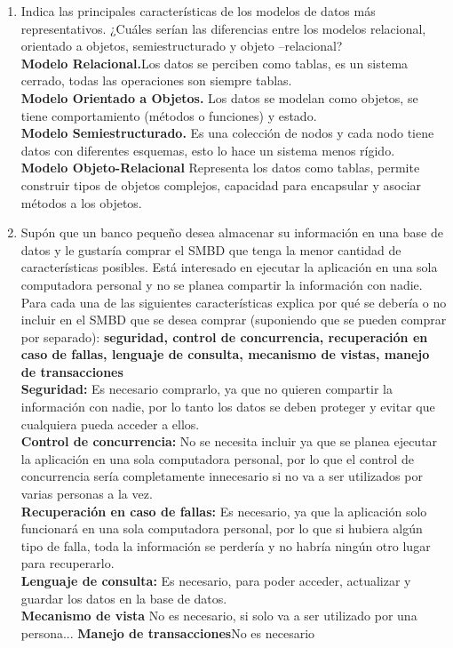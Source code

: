 \documentclass[12pt]{article}
\begin{document}
\begin{enumerate}
\begin{itemize}
	  \end{itemize}
  
      \item Indica las principales características de los modelos de
      datos más representativos. ¿Cuáles serían las diferencias
      entre los  modelos relacional, orientado a objetos,
      semiestructurado y objeto –relacional?\\
      \textbf{Modelo Relacional.}Los datos se perciben como tablas,
      es un sistema cerrado, todas las operaciones son siempre tablas.\\
      \textbf{Modelo Orientado a Objetos.} Los datos se modelan como
      objetos, se tiene comportamiento (métodos o funciones) y estado.\\
      \textbf{Modelo Semiestructurado.} Es una colección de nodos y
      cada nodo tiene datos con diferentes esquemas, esto lo hace un 
      sistema menos rígido.\\
      \textbf{Modelo Objeto-Relacional} Representa los datos como tablas,
      permite construir tipos de objetos complejos, capacidad para
      encapsular y asociar métodos a los objetos.
      
      \item Supón  que  un banco pequeño desea  almacenar  su
      información  en una  base  de  datos  y  le gustaría comprar
      el SMBD que  tenga  la  menor  cantidad  de  características
      posibles. Está interesado en ejecutar la aplicación en una sola computadora personal y no se planea compartir la 
      información  con  nadie.  Para  cada  una  de  las
      siguientes  características  explica  por  qué  se debería o
      no incluir en el SMBD que se desea comprar (suponiendo que se
      pueden comprar por separado): \textbf{seguridad, control de
      concurrencia, recuperación en caso de fallas, lenguaje de
      consulta, mecanismo de vistas, manejo de transacciones}\\
      \textbf{Seguridad:} Es necesario comprarlo, ya que no quieren
      compartir la información con nadie, por lo tanto los datos
      se deben proteger y evitar que cualquiera pueda acceder a 
      ellos.\\
      \textbf{Control de concurrencia:} No se necesita incluir ya que
      se planea ejecutar la aplicación en una sola computadora 
      personal, por lo que el control de concurrencia sería 
      completamente innecesario si no va a ser utilizados por varias
      personas a la vez.\\
      \textbf{Recuperación en caso de fallas:} Es necesario, ya que
      la aplicación solo funcionará en una sola computadora personal,
      por lo que si hubiera algún tipo de falla, toda la información
      se perdería y no habría ningún otro lugar para recuperarlo.\\
      \textbf{Lenguaje de consulta:} Es necesario, para poder acceder,
      actualizar y guardar los datos en la base de datos.\\
      \textbf{Mecanismo de vista} No es necesario, si solo va a ser
      utilizado por una persona...
      \textbf{Manejo de transacciones}No es necesario\\
      

\end{enumerate}
\end{document}
